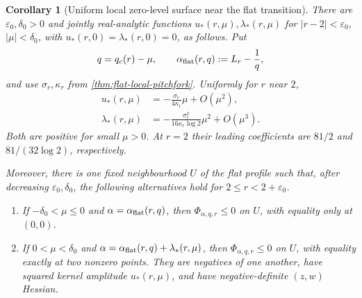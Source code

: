 \documentclass[11pt,reqno]{amsart}
\numberwithin{equation}{section}
\newtheorem{corollary}[corollary]{Corollary}
\theoremstyle{definition}
\theoremstyle{remark}
\begin{document}
\begin{corollary}[Uniform local zero-level surface near the flat transition]
\label{cor:flat-zero-level-surface}
There are $\varepsilon_0,\delta_0>0$ and jointly real-analytic functions
$u_*(r,\mu),\lambda_*(r,\mu)$ for
$|r-2|<\varepsilon_0$, $|\mu|<\delta_0$, with
$u_*(r,0)=\lambda_*(r,0)=0$, as follows.  Put
\[
  q=q_c(r)-\mu,
  \qquad
  \alpha_{\rm flat}(r,q):=L_r-\frac1q,
\]
and use $\sigma_r,\kappa_r$ from
\cref{thm:flat-local-pitchfork}.  Uniformly for $r$ near $2$,
\begin{align}
  u_*(r,\mu)
  &=-\frac{\sigma_r}{4\kappa_r}\mu+O(\mu^2),
  \label{eq:zero-level-amplitude}\\
  \lambda_*(r,\mu)
  &=-\frac{\sigma_r^2}{16\kappa_r\log2}\mu^2+O(\mu^3).
  \label{eq:zero-level-alpha-correction}
\end{align}
Both are positive for small $\mu>0$.  At $r=2$ their leading coefficients are
$81/2$ and $81/(32\log2)$, respectively.

Moreover, there is one fixed neighbourhood $U$ of the flat profile such that,
after decreasing $\varepsilon_0,\delta_0$, the following alternatives hold for
$2\le r<2+\varepsilon_0$.
\begin{enumerate}[label=\textup{(\roman*)}]
  \item If $-\delta_0<\mu\le0$ and $\alpha=\alpha_{\rm flat}(r,q)$, then
  $\Phi_{\alpha,q,r}\le0$ on $U$, with equality only at $(0,0)$.
  \item If $0<\mu<\delta_0$ and
  $\alpha=\alpha_{\rm flat}(r,q)+\lambda_*(r,\mu)$, then
  $\Phi_{\alpha,q,r}\le0$ on $U$, with equality exactly at two nonzero points.
  They are negatives of one another, have squared kernel amplitude
  $u_*(r,\mu)$, and have negative-definite $(z,w)$ Hessian.
\end{enumerate}
\end{corollary}
\end{document}

